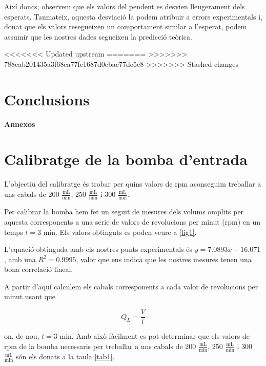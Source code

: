 \documentclass[10pt, twoside]{article}
\begin{document}
Així doncs, observem que els valors del pendent es desvien lleugerament dels esperats. Tanmateix, aquesta desviació la podem atribuir a errors experimentals i, donat que els valors resegueixen un comportament similar a l'esperat, podem assumir que les nostres dades segueixen la predicció teòrica.

<<<<<<< Updated upstream
=======
>>>>>>> 788cab201435a3f68ea77fc1687d0ebac77dc5e8
>>>>>>> Stashed changes
\section{Conclusions}



\newpage
\appendix
{\Huge \textbf{Annexos}}

\section{Calibratge de la bomba d'entrada}
L'objectiu del calibratge és trobar per quins valors de rpm aconseguim treballar a uns cabals de 200 $\frac{\text{mL}}{\text{min}}$, 250 $\frac{\text{mL}}{\text{min}}$ i 300 $\frac{\text{mL}}{\text{min}}$. 

Per calibrar la bomba hem fet un seguit de mesures dels volums omplits per aquesta corresponents a una serie de valors de revolucions per minut (rpm) en un temps $t = 3$ min. Els valors obtinguts es poden veure a \ref{fig1}.

L'equació obtinguda amb els nostres punts experimentals és $y=7.0893x-16.071$, amb una $R^2 = 0.9995$, valor que ens indica que les nostres mesures tenen una bona correlació lineal.

A partir d'aquí calculem els cabals corresponents a cada valor de revolucions per minut usant que

\begin{equation}
    Q_L = \frac{V}{t}
\end{equation}

on, de nou, $t=3$ min. Amb això fàcilment es pot determinar que els valors de rpm de la bomba necessaris per treballar a uns cabals de 200 $\frac{\text{mL}}{\text{min}}$, 250 $\frac{\text{mL}}{\text{min}}$ i 300 $\frac{\text{mL}}{\text{min}}$ són els donats a la taula \ref{tab1}.
\end{document}
